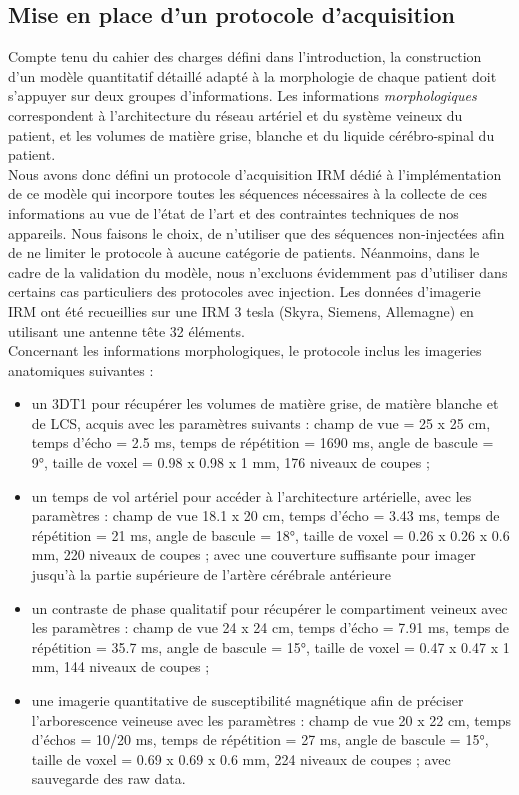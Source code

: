 \subsection{Mise en place d'un protocole d'acquisition}
Compte tenu du cahier des charges défini dans l’introduction, la construction d’un modèle quantitatif détaillé adapté à la morphologie de chaque patient doit s’appuyer sur deux groupes d’informations. Les informations {\em morphologiques} correspondent à l’architecture du réseau artériel et du système veineux du patient, et les volumes de matière grise, blanche et du liquide cérébro-spinal du patient.\\
Nous avons donc défini un protocole d’acquisition IRM dédié à l’implémentation de ce modèle qui incorpore toutes les séquences nécessaires à la collecte de ces informations au vue de l’état de l’art et des contraintes techniques de nos appareils. Nous faisons le choix, de n’utiliser que des séquences non-injectées afin de ne limiter le protocole à aucune catégorie de patients. Néanmoins, dans le cadre de la validation du modèle,  nous n’excluons évidemment pas d’utiliser dans certains cas particuliers des protocoles avec injection. Les données d’imagerie IRM ont été recueillies sur une IRM 3 tesla (Skyra, Siemens, Allemagne) en utilisant une antenne tête 32 éléments.\\
Concernant les informations morphologiques, le protocole inclus les imageries anatomiques suivantes :
\begin{itemize}
\item un 3DT1 pour récupérer les volumes de matière grise, de matière blanche et de LCS, acquis avec les paramètres suivants : champ de vue = 25 x 25 cm, temps d’écho = 2.5 ms, temps de répétition = 1690 ms, angle de bascule = 9°, taille de voxel = 0.98 x 0.98 x 1 mm, 176 niveaux de coupes ;
\item un temps de vol artériel pour accéder à l’architecture artérielle, avec les paramètres : champ de vue 18.1 x 20 cm, temps d’écho = 3.43 ms, temps de répétition = 21 ms, angle de bascule = 18°, taille de voxel = 0.26 x 0.26 x 0.6 mm, 220 niveaux de coupes ; avec une couverture suffisante pour imager jusqu’à la partie supérieure de l’artère cérébrale antérieure
\item un contraste de phase qualitatif pour récupérer le compartiment veineux avec les paramètres : champ de vue 24 x 24 cm, temps d’écho = 7.91 ms, temps de répétition = 35.7 ms, angle de bascule = 15°, taille de voxel = 0.47 x 0.47 x 1 mm, 144 niveaux de coupes ;
\item une imagerie quantitative de susceptibilité magnétique afin de préciser l’arborescence veineuse avec les paramètres : champ de vue 20 x 22 cm, temps d’échos = 10/20 ms, temps de répétition = 27 ms, angle de bascule = 15°, taille de voxel = 0.69 x 0.69 x 0.6 mm, 224 niveaux de coupes ; avec sauvegarde des raw data.
\end{itemize}
